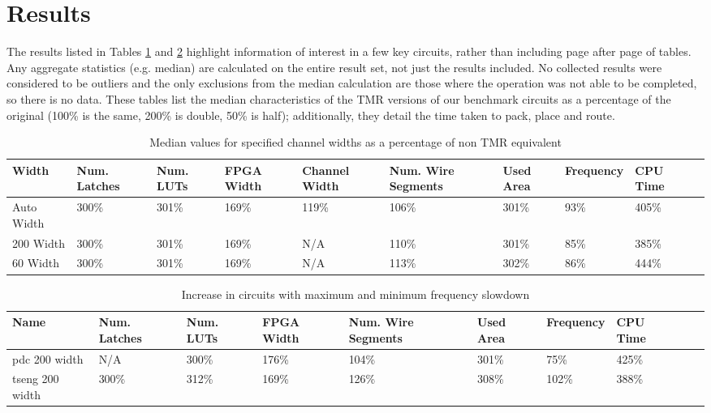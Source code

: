 \documentclass[12pt,final,oneside]{dwThesis} %
\begin{document}
\section{Results}\label{BenchmarkResults}
The results listed in Tables \ref{medianRes} and \ref{timing} highlight information of interest in a few key circuits, rather than including page after page of tables. Any aggregate statistics (e.g. median) are calculated on the entire result set, not just the results included. No collected results were considered to be outliers and the only exclusions from the median calculation are those where the operation was not able to be completed, so there is no data.
These tables list the median characteristics of the \ac{TMR} versions of our benchmark circuits as a percentage of the original (100\% is the same, 200\% is double, 50\% is half); additionally, they detail the time taken to pack, place and route.
\begin{table}
    \begin{adjustwidth}{-1.0cm}{-1.05cm}
        \begin{tabularx}{1.1\textwidth}{lXXXXXXllX}
           \toprule
            Width & Num. Latches & Num. \acp{LUT} & FPGA Width & Channel Width & Num. Wire Segments & Used Area & Frequency & CPU Time\\
          \midrule
            Auto Width         & 300\% & 301\% & 169\% & 119\% & 106\% & 301\% & 93\% & 405\%\\
            200 Width          & 300\% & 301\% & 169\% & N/A   & 110\% & 301\% & 85\% & 385\%\\
            60 Width           & 300\% & 301\% & 169\% & N/A   & 113\% & 302\% & 86\% & 444\%\\
          \bottomrule
        \end{tabularx}
        \caption{Median values for specified channel widths as a percentage of non \ac{TMR} equivalent}
        \label{medianRes}
    \end{adjustwidth}
\end{table}

\begin{table}
    \begin{adjustwidth}{-1cm}{-1.1cm}
        \begin{tabularx}{1.1\textwidth}{lXXXXXXXXX}
           \toprule
            Name & Num. Latches & Num. \acp{LUT} & FPGA Width & Num. Wire Segments & Used Area & Frequency & CPU Time\\
            \midrule
pdc 200 width   & N/A   & 300\% & 176\% & 104\% & 301\% &  75\% & 425\%\\
tseng 200 width & 300\% & 312\% & 169\% & 126\% & 308\% &  102\% & 388\%\\
          \bottomrule
        \end{tabularx}
        \caption{Increase in circuits with maximum and minimum frequency slowdown}
        \label{timing}
    \end{adjustwidth}
\end{table}
\end{document}
